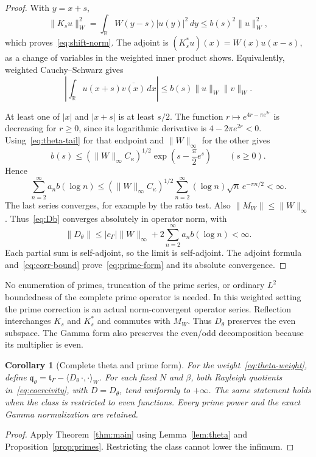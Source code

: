 \documentclass[11pt]{article}
\newtheorem{corollary}[theorem]{Corollary}
\theoremstyle{definition}
\theoremstyle{remark}
\newcommand{\R}{\mathbb R}
\newcommand{\tg}{\mathfrak t_\Gamma}
\newcommand{\qth}{\mathfrak q_\theta}
\newcommand{\ip}[2]{\langle #1,#2\rangle}
\newcommand{\norm}[1]{\lVert #1\rVert}
\newcommand{\dd}{\,dx}
\begin{document}
\begin{proof}
With $y=x+s$,
\[
 \norm{K_su}_W^2
 =\int_\R W(y-s)|u(y)|^2\,dy
 \le b(s)^2\norm u_W^2,
\]
which proves~\eqref{eq:shift-norm}. The adjoint is
$(K_s^*u)(x)=W(x)u(x-s)$, as a change of variables in the weighted inner
product shows. Equivalently, weighted Cauchy--Schwarz gives
\begin{equation}\label{eq:corr-bound}
 \left|\int_\R u(x+s)\overline{v(x)}\dd\right|
 \le b(s)\norm u_W\norm v_W.
\end{equation}

At least one of $|x|$ and $|x+s|$ is at least $s/2$. The function
$r\mapsto e^{4r-\pi e^{2r}}$ is decreasing for $r\ge0$, since its
logarithmic derivative is $4-2\pi e^{2r}<0$. Using~\eqref{eq:theta-tail}
for that endpoint and $\norm W_\infty$ for the other gives
\begin{equation}\label{eq:bs}
 b(s)\le(\norm W_\infty C_\kappa)^{1/2}
 \exp\left(s-\frac\pi2e^s\right)\qquad(s\ge0).
\end{equation}
Hence
\begin{equation}\label{eq:prime-summability}
 \sum_{n=2}^\infty a_n b(\log n)
 \le(\norm W_\infty C_\kappa)^{1/2}
 \sum_{n=2}^\infty (\log n)\sqrt n\,e^{-\pi n/2}<\infty.
\end{equation}
The last series converges, for example by the ratio test. Also
$\norm{M_W}\le\norm W_\infty$. Thus~\eqref{eq:Db} converges absolutely
in operator norm, with
\begin{equation}\label{eq:D-norm}
 \norm{D_\theta}\le |c_\Gamma|\norm W_\infty+
 2\sum_{n=2}^\infty a_n b(\log n)<\infty.
\end{equation}
Each partial sum is self-adjoint, so the limit is self-adjoint.
The adjoint formula and~\eqref{eq:corr-bound} prove~\eqref{eq:prime-form}
and its absolute convergence.
\end{proof}

No enumeration of primes, truncation of the prime series, or ordinary
$L^2$ boundedness of the complete prime operator is needed. In this
weighted setting the prime correction is an actual norm-convergent
operator series. Reflection interchanges $K_s$ and $K_s^*$ and commutes
with $M_W$. Thus $D_\theta$ preserves the even subspace. The Gamma form
also preserves the even/odd decomposition because its multiplier is even.

\begin{corollary}[Complete theta and prime form]\label{cor:theta}
For the weight~\eqref{eq:theta-weight}, define
$\qth=\tg-\ip{D_\theta\,\cdot}{\cdot}_W$. For each fixed $N$ and
$\beta$, both Rayleigh quotients in~\eqref{eq:coercivity}, with
$D=D_\theta$, tend uniformly to $+\infty$. The same statement holds
when the class is restricted to even functions. Every prime power and the
exact Gamma normalization are retained.
\end{corollary}
\begin{proof}
Apply Theorem~\ref{thm:main} using Lemma~\ref{lem:theta} and
Proposition~\ref{prop:primes}. Restricting the class cannot lower the infimum.
\end{proof}
\end{document}
